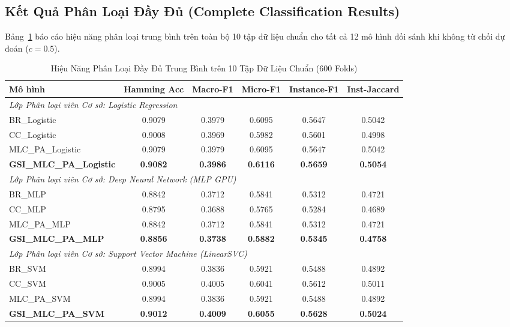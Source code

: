 \documentclass[11pt,a4paper]{article}
\begin{document}
\newpage
\subsection{Kết Quả Phân Loại Đầy Đủ (Complete Classification Results)}
Bảng~\ref{tab:complete_benchmark_results} báo cáo hiệu năng phân loại trung bình trên toàn bộ 10 tập dữ liệu chuẩn cho tất cả 12 mô hình đối sánh khi không từ chối dự đoán ($c = 0.5$).

\begin{table}[htbp]
\centering
\caption{Hiệu Năng Phân Loại Đầy Đủ Trung Bình trên 10 Tập Dữ Liệu Chuẩn (600 Folds)}
\label{tab:complete_benchmark_results}
\small
\begin{tabular}{lccccc}
\toprule
\textbf{Mô hình} & \textbf{Hamming Acc} & \textbf{Macro-F1} & \textbf{Micro-F1} & \textbf{Instance-F1} & \textbf{Inst-Jaccard} \\
\midrule
\multicolumn{6}{l}{\textit{Lớp Phân loại viên Cơ sở: Logistic Regression}} \\
\quad BR\_Logistic & 0.9079 & 0.3979 & 0.6095 & 0.5647 & 0.5042 \\
\quad CC\_Logistic & 0.9008 & 0.3969 & 0.5982 & 0.5601 & 0.4998 \\
\quad MLC\_PA\_Logistic & 0.9079 & 0.3979 & 0.6095 & 0.5647 & 0.5042 \\
\quad \textbf{GSI\_MLC\_PA\_Logistic} & \textbf{0.9082} & \textbf{0.3986} & \textbf{0.6116} & \textbf{0.5659} & \textbf{0.5054} \\
\midrule
\multicolumn{6}{l}{\textit{Lớp Phân loại viên Cơ sở: Deep Neural Network (MLP GPU)}} \\
\quad BR\_MLP & 0.8842 & 0.3712 & 0.5841 & 0.5312 & 0.4721 \\
\quad CC\_MLP & 0.8795 & 0.3688 & 0.5765 & 0.5284 & 0.4689 \\
\quad MLC\_PA\_MLP & 0.8842 & 0.3712 & 0.5841 & 0.5312 & 0.4721 \\
\quad \textbf{GSI\_MLC\_PA\_MLP} & \textbf{0.8856} & \textbf{0.3738} & \textbf{0.5882} & \textbf{0.5345} & \textbf{0.4758} \\
\midrule
\multicolumn{6}{l}{\textit{Lớp Phân loại viên Cơ sở: Support Vector Machine (LinearSVC)}} \\
\quad BR\_SVM & 0.8994 & 0.3836 & 0.5921 & 0.5488 & 0.4892 \\
\quad CC\_SVM & 0.9005 & 0.4005 & 0.6041 & 0.5612 & 0.5011 \\
\quad MLC\_PA\_SVM & 0.8994 & 0.3836 & 0.5921 & 0.5488 & 0.4892 \\
\quad \textbf{GSI\_MLC\_PA\_SVM} & \textbf{0.9012} & \textbf{0.4009} & \textbf{0.6055} & \textbf{0.5628} & \textbf{0.5024} \\
\bottomrule
\end{tabular}
\end{table}
\end{document}
